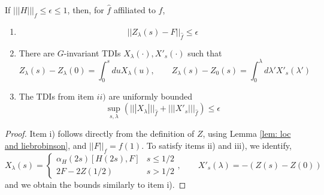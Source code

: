 \begin{lemma}\label{lem: loop is small}
	If  $|||H|||_f\leq  \epsilon \leq  1$, then, for $\hat{f}$ affiliated to $f$,
	\begin{enumerate}
		\item  $$
		||Z_\lambda(s)-F||_{\hat{f}} \leq   \epsilon  
		$$
		\item  There are $G$-invariant TDIs $X_\lambda(\cdot), X'_s(\cdot)$ such that 
		$$
		Z_{\lambda}(s)-Z_{\lambda}(0)=\int_{0}^{s} du X_\lambda(u), \qquad    Z_{\lambda}(s)-Z_{0}(s)=\int_{0}^{\lambda} d\lambda' X'_s(\lambda') 
		$$
		\item  The TDIs  from item $ii)$ are uniformly bounded 
		$$ \sup_{s,\lambda} (||| X_\lambda |||_{\hat{f}}+ ||| X'_s |||_{\hat{f}}) \leq \epsilon
		$$
	\end{enumerate}
\end{lemma}
\begin{proof}
	Item i) follows directly from the definition of $Z$, using Lemma \ref{lem: loc and liebrobinson}, and $||F||_f =f(1)$. 
	To satisfy items ii) and iii), we identify,
	$$
	X_\lambda(s)= \begin{cases} \alpha_H(2s)[H(2s),F] &  s\leq 1/2  \\[2mm]
		2F-2Z(1/2)  & s>1/2  \end{cases},\qquad  X'_s(\lambda)= - (Z(s)-Z(0))
	$$ 
	and we obtain the bounds similarly to item i). 
\end{proof}

